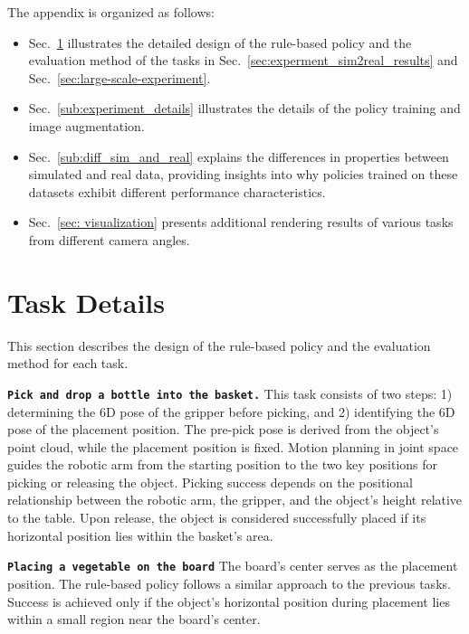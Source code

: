 \newpage
\appendix
\onecolumn
\setcounter{page}{1}

The appendix is organized as follows:


\begin{itemize}[leftmargin=*]
    \item Sec.~\ref{sub:task_details} illustrates the detailed design of the rule-based policy and the evaluation method of the tasks in Sec.~\ref{sec:experment_sim2real_results} and Sec.~\ref{sec:large-scale-experiment}. 
    \item Sec.~\ref{sub:experiment_details} illustrates the details of the policy training and image augmentation.
    \item Sec.~\ref{sub:diff_sim_and_real} explains the differences in properties between simulated and real data, providing insights into why policies trained on these datasets exhibit different performance characteristics.
    \item Sec.~\ref{sec: visualization} presents additional rendering results of various tasks from different camera angles.
\end{itemize}

\section{Task Details}
\label{sub:task_details}

This section describes the design of the rule-based policy and the evaluation method for each task.

\noindent\textbf{\texttt{Pick and drop a bottle into the basket.}}
This task consists of two steps: 1) determining the 6D pose of the gripper before picking, and 2) identifying the 6D pose of the placement position. The pre-pick pose is derived from the object's point cloud, while the placement position is fixed. Motion planning in joint space guides the robotic arm from the starting position to the two key positions for picking or releasing the object. Picking success depends on the positional relationship between the robotic arm, the gripper, and the object's height relative to the table. Upon release, the object is considered successfully placed if its horizontal position lies within the basket's area.

\noindent\textbf{\texttt{Placing a vegetable on the board}}
The board's center serves as the placement position. The rule-based policy follows a similar approach to the previous tasks. Success is achieved only if the object's horizontal position during placement lies within a small region near the board's center.

